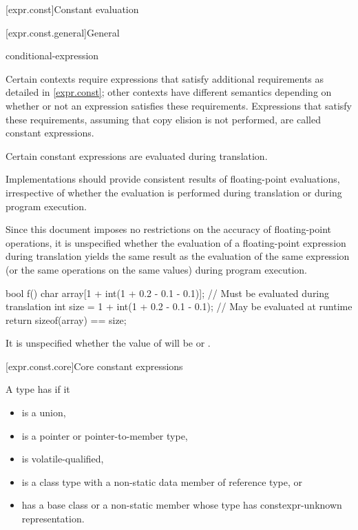 [expr.const]{Constant evaluation}%

[expr.const.general]{General}

\begin{bnf}
\br
    conditional-expression
\end{bnf}

\pnum
Certain contexts require expressions that satisfy additional
requirements as detailed in \ref{expr.const}; other contexts have different
semantics depending on whether or not an expression satisfies these requirements.
Expressions that satisfy these requirements,
assuming that copy elision is not performed,
are called constant expressions.
\begin{note}
Certain constant expressions are evaluated during translation.
\end{note}

\pnum
\recommended
Implementations should provide consistent results of floating-point evaluations,
irrespective of whether the evaluation is performed
during translation or during program execution.
\begin{note}
Since this document
imposes no restrictions on the accuracy of floating-point operations, it is unspecified whether the
evaluation of a floating-point expression during translation yields the same result as the
evaluation of the same expression (or the same operations on the same values) during program
execution.
\begin{example}
\begin{codeblock}
bool f() {
    char array[1 + int(1 + 0.2 - 0.1 - 0.1)];   // Must be evaluated during translation
    int size = 1 + int(1 + 0.2 - 0.1 - 0.1);    // May be evaluated at runtime
    return sizeof(array) == size;
}
\end{codeblock}
It is unspecified whether the value of  will be  or .
\end{example}
\end{note}

[expr.const.core]{Core constant expressions}

\pnum
{}%
A type has  if it
\begin{itemize}
\item is a union,
\item is a pointer or pointer-to-member type,
\item is volatile-qualified,
\item is a class type with a non-static data member of reference type, or
\item
has a base class or a non-static member whose
type has constexpr-unknown representation.
\end{itemize}

